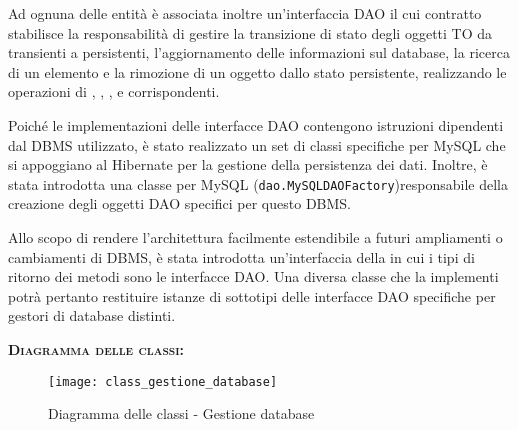 \begin{description}
Ad ognuna delle entità è associata inoltre un'interfaccia DAO il cui contratto stabilisce la responsabilità di gestire la transizione di stato degli oggetti TO da transienti a persistenti, l'aggiornamento delle informazioni sul database, la ricerca di un elemento e la rimozione di un oggetto dallo stato persistente, realizzando le operazioni di , , ,  e  corrispondenti.

Poiché le implementazioni delle interfacce DAO contengono istruzioni dipendenti dal DBMS utilizzato, è stato realizzato un set di classi specifiche per MySQL che si appoggiano al  Hibernate per la gestione della persistenza dei dati. Inoltre, è stata introdotta una classe  per MySQL (\texttt{dao.MySQLDAOFactory})responsabile della creazione degli oggetti DAO specifici per questo DBMS\@.

Allo scopo di rendere l'architettura facilmente estendibile a futuri ampliamenti o cambiamenti di DBMS, è stata introdotta un'interfaccia della  in cui i tipi di ritorno dei metodi sono le interfacce DAO\@. Una diversa classe  che la implementi potrà pertanto restituire istanze di sottotipi delle interfacce DAO specifiche per gestori di database distinti.

\item{\scshape\bfseries Diagramma delle classi:}
\begin{figure}[H]
  \centering
  \texttt{[image: class\_gestione\_database]}
  \caption{Diagramma delle classi - Gestione database}\label{fig:gestionedatabase}
\end{figure}


\end{description}
